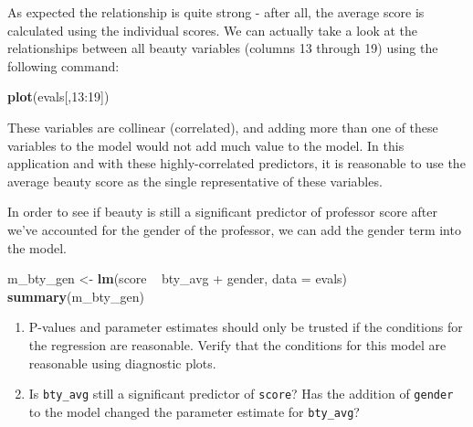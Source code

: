 \documentclass[]{book}
\newenvironment{Shaded}{\begin{snugshade}}{\end{snugshade}}
\newcommand{\KeywordTok}[1]{\textcolor[rgb]{0.13,0.29,0.53}{\textbf{{#1}}}}
\newcommand{\DataTypeTok}[1]{\textcolor[rgb]{0.13,0.29,0.53}{{#1}}}
\newcommand{\DecValTok}[1]{\textcolor[rgb]{0.00,0.00,0.81}{{#1}}}
\newcommand{\StringTok}[1]{\textcolor[rgb]{0.31,0.60,0.02}{{#1}}}
\newcommand{\NormalTok}[1]{{#1}}
\theoremstyle{definition}
\theoremstyle{definition}
\theoremstyle{remark}
\begin{document}
\begin{Shaded}
\end{Shaded}

As expected the relationship is quite strong - after all, the average
score is calculated using the individual scores. We can actually take a
look at the relationships between all beauty variables (columns 13
through 19) using the following command:

\begin{Shaded}
\begin{Highlighting}[]
\KeywordTok{plot}\NormalTok{(evals[,}\DecValTok{13}\NormalTok{:}\DecValTok{19}\NormalTok{])}
\end{Highlighting}
\end{Shaded}

These variables are collinear (correlated), and adding more than one of
these variables to the model would not add much value to the model. In
this application and with these highly-correlated predictors, it is
reasonable to use the average beauty score as the single representative
of these variables.

In order to see if beauty is still a significant predictor of professor
score after we've accounted for the gender of the professor, we can add
the gender term into the model.

\begin{Shaded}
\begin{Highlighting}[]
\NormalTok{m_bty_gen <-}\StringTok{ }\KeywordTok{lm}\NormalTok{(score ~}\StringTok{ }\NormalTok{bty_avg +}\StringTok{ }\NormalTok{gender, }\DataTypeTok{data =} \NormalTok{evals)}
\KeywordTok{summary}\NormalTok{(m_bty_gen)}
\end{Highlighting}
\end{Shaded}

\begin{enumerate}
\def\labelenumi{\arabic{enumi}.}
\setcounter{enumi}{6}
\item
  P-values and parameter estimates should only be trusted if the
  conditions for the regression are reasonable. Verify that the
  conditions for this model are reasonable using diagnostic plots.
\item
  Is \texttt{bty\_avg} still a significant predictor of \texttt{score}?
  Has the addition of \texttt{gender} to the model changed the parameter
  estimate for \texttt{bty\_avg}?
\end{enumerate}
\end{document}
